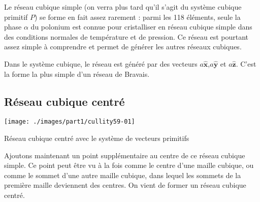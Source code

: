 Le réseau cubique simple (on verra plus tard qu'il s'agit du système cubique primitif $P$) se forme en fait assez rarement : parmi les 118 éléments, seule la phase $\alpha$ du polonium est connue pour cristalliser en réseau cubique simple dans des conditions normales de température et de pression. Ce réseau est pourtant assez simple à comprendre et permet de générer les autres réseaux cubiques.

Dans le système cubique, le réseau est généré par des vecteurs $a\mathbf{\hat{x}}$,$a\mathbf{\hat{y}}$ et $a\mathbf{\hat{z}}$. C'est la forme la plus simple d'un réseau de Bravais.
 
\subsection{Réseau cubique centré}


\begin{marginfigure}
    \texttt{[image: ./images/part1/cullity59-01]}
    \caption{Réseau cubique centré avec le système de vecteurs primitifs}
    \label{fig:bcc}
\end{marginfigure}


Ajoutons maintenant un point supplémentaire au centre de ce réseau cubique simple. Ce point peut être vu à la fois comme le centre d'une maille cubique, ou comme le sommet d'une autre maille cubique, dans lequel les sommets de la première maille deviennent des centres. On vient de former un réseau cubique centré.

